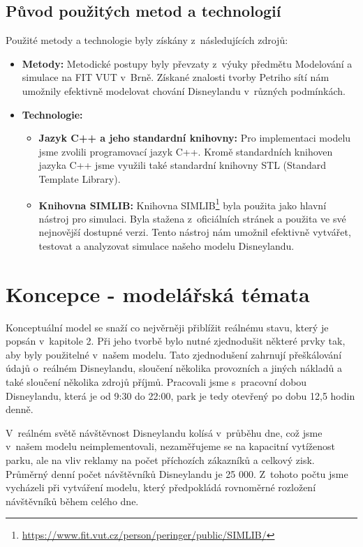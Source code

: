 \newpage
\section{Původ použitých metod a technologií} 
Použité metody a technologie byly získány z~následujících zdrojů: \begin{itemize} \item \textbf{Metody:} Metodické postupy byly převzaty z~výuky předmětu Modelování a simulace na FIT VUT v~Brně. Získané znalosti tvorby Petriho sítí nám umožnily efektivně modelovat chování Disneylandu v~různých podmínkách. \item \textbf{Technologie:} \begin{itemize} \item \textbf{Jazyk C++ a jeho standardní knihovny:} Pro implementaci modelu jsme zvolili programovací jazyk C++. Kromě standardních knihoven jazyka C++ jsme využili také standardní knihovny STL (Standard Template Library). \item \textbf{Knihovna SIMLIB:} Knihovna SIMLIB\footnote{\url{https://www.fit.vut.cz/person/peringer/public/SIMLIB/}} byla použita jako hlavní nástroj pro simulaci. Byla stažena z~oficiálních stránek a použita ve své nejnovější dostupné verzi. Tento nástroj nám umožnil efektivně vytvářet, testovat a analyzovat simulace našeho modelu Disneylandu. \end{itemize} \end{itemize}

\chapter{Koncepce - modelářská témata} 
Konceptuální model se snaží co nejvěrněji přiblížit reálnému stavu, který je popsán v~kapitole 2. Při jeho tvorbě bylo nutné zjednodušit některé prvky tak, aby byly použitelné v~našem modelu. Tato zjednodušení zahrnují přeškálování údajů o~reálném Disneylandu, sloučení několika provozních a jiných nákladů a také sloučení několika zdrojů příjmů. Pracovali jsme s~pracovní dobou Disneylandu, která je od 9:30 do 22:00, park je tedy otevřený po dobu 12,5 hodin denně.

V~reálném světě návštěvnost Disneylandu kolísá v~průběhu dne, což jsme v~našem modelu neimplementovali, nezaměřujeme se na kapacitní vytíženost parku, ale na vliv reklamy na počet příchozích zákazníků a celkový zisk. Průměrný denní počet návštěvníků Disneylandu je 25 000. Z~tohoto počtu jsme vycházeli při vytváření modelu, který předpokládá rovnoměrné rozložení návštěvníků během celého dne.

